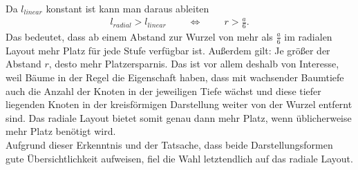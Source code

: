 Da $l_{linear}$ konstant ist kann man daraus ableiten
\begin{align*}
l_{radial} > l_{linear} \mspace{40mu} \Leftrightarrow  \mspace{40mu} r > \frac{a}{6}.
\end{align*}
Das bedeutet, dass ab einem Abstand zur Wurzel von mehr als $\frac{a}{6}$ im radialen Layout mehr Platz für jede Stufe verfügbar ist. Außerdem gilt: Je größer der Abstand $r$, desto mehr Platzersparnis. Das ist vor allem deshalb von Interesse, weil Bäume in der Regel die Eigenschaft haben, dass mit wachsender Baumtiefe auch die Anzahl der Knoten in der jeweiligen Tiefe wächst und diese tiefer liegenden Knoten in der kreisförmigen Darstellung weiter von der Wurzel entfernt sind. Das radiale Layout bietet somit genau dann mehr Platz, wenn üblicherweise mehr Platz benötigt wird.\\
Aufgrund dieser Erkenntnis und der Tatsache, dass beide Darstellungsformen gute Übersichtlichkeit aufweisen, fiel die Wahl letztendlich auf das radiale Layout.

